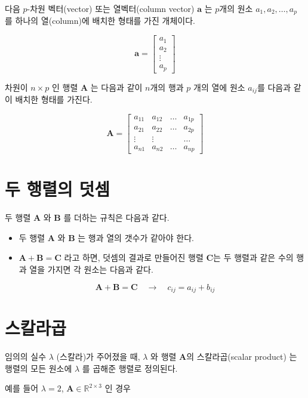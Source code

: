 \documentclass[
  11pt,
  a4paper,
  oneside]{scrbook}
\providecommand{\tightlist}{%
  \setlength{\itemsep}{0pt}\setlength{\parskip}{0pt}}\usepackage{longtable,booktabs,array}
\newcommand{\RR}{\mathbb{R}}
\theoremstyle{definition}
\theoremstyle{plain}
\theoremstyle{definition}
\theoremstyle{definition}
\theoremstyle{remark}
\begin{document}
다음 \(p\)-차원 벡터(vector) 또는 열벡터(column vector) \(\pmb a\) 는
\(p\)개의 원소 \(a_1, a_2, \dots, a_p\) 를 하나의 열(column)에 배치한
형태를 가진 개체이다.

\[
\pmb a = 
\begin{bmatrix}
a_1 \\
a_2 \\
\vdots \\
a_p 
\end{bmatrix}
\]

차원이 \(n \times p\) 인 행렬 \(\pmb A\) 는 다음과 같이 \(n\)개의 행과
\(p\) 개의 열에 원소 \(a_{ij}\)를 다음과 같이 배치한 형태를 가진다.

\[
\pmb A = 
\begin{bmatrix}
a_{11} & a_{12} & \dots & a_{1p} \\
a_{21} & a_{22} & \dots & a_{2p} \\
\vdots & \vdots &    & \dots \\
a_{n1} & a_{n2} & \dots & a_{np} 
\end{bmatrix}
\]

\section{두 행렬의 덧셈}\label{uxb450-uxd589uxb82cuxc758-uxb367uxc148}

두 행렬 \(\pmb A\) 와 \(\pmb B\) 를 더하는 규칙은 다음과 같다.

\begin{itemize}
\tightlist
\item
  두 행렬 \(\pmb A\) 와 \(\pmb B\) 는 행과 열의 갯수가 같아야 한다.
\item
  \(\pmb A + \pmb B = \pmb C\) 라고 하면, 덧셈의 결과로 만들어진 행렬
  \(\pmb C\)는 두 행렬과 같은 수의 행과 열을 가지면 각 원소는 다음과
  같다.
\end{itemize}

\[ \pmb A + \pmb B = \pmb C \quad \rightarrow \quad c_{ij} = a_{ij} + b_{ij} \]

\section{스칼라곱}\label{uxc2a4uxce7cuxb77cuxacf1}

임의의 실수 \(\lambda\) (스칼라)가 주어졌을 때, \(\lambda\) 와 행렬
\(\pmb A\)의 스칼라곱(scalar product) 는 행렬의 모든 원소에 \(\lambda\)
를 곱해준 행렬로 정의된다.

예를 들어 \(\lambda=2\), \(\pmb A \in \RR^{2\times 3}\) 인 경우
\end{document}
